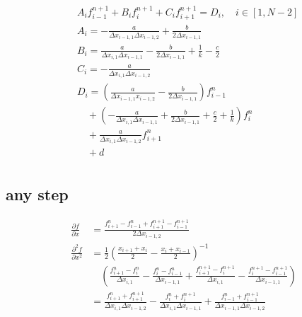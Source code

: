 \documentclass{article}
\begin{document}
    \begin{equation}
        \begin{split}
            &A_{i} f_{i-1}^{n+1} + B_{i} f_{i}^{n+1} + C_{i} f_{i+1}^{n+1} = D_{i}, \quad i \in [1, N-2]
            \\
            &A_{i} =
            -\frac{a}{\Delta x_{i-1,1}\Delta x_{i-1,2}} + \frac{b}{2\Delta x_{i-1,1}}
            \\
            &B_{i} =
            \frac{a}{\Delta x_{i,1} \Delta x_{i-1,1}} -\frac{b}{2 \Delta x_{i-1,1}} + \frac{1}{k} -\frac{c}{2}
            \\
            &C_{i} =
            -\frac{a}{\Delta x_{i,1} \Delta x_{i-1,2}}
            \\
            &D_{i} =
            \left(
            \frac{a}{\Delta x_{i-1,1} x_{i-1,2}} - \frac{b}{2 \Delta x_{i-1,1}}
            \right)
            f_{i-1}^n
            \\
            & \quad +
            \left(
            -\frac{a}{\Delta x_{i,1} \Delta x_{i-1,1}} + \frac{b}{2 \Delta x_{i-1,1}} + \frac{c}{2} + \frac{1}{k}
            \right)
            f_{i}^n
            \\
            &\quad +
            \frac{a}{\Delta x_{i,1} \Delta x_{i-1,2}}
            f_{i+1}^n
            \\
            &\quad + d \\
        \end{split}
    \end{equation}

\subsection{any step}

    \begin{equation}
        \begin{split}
            \frac{\partial f}{\partial x} &=
            \frac{f_{i+1}^n -f_{i-1}^n + f_{i+1}^{n+1} - f_{i-1}^{n+1}}
                {2 \Delta x_{i-1,2}} 
            \\
            \frac{\partial^2 f}{\partial x^2} &=
            \frac{1}{2}\left(\frac{x_{i+1}+x_i}{2} - \frac{x_i+x_{i-1}}{2}\right)^{-1}
            \\
            & \quad \left(
            \frac{f_{i+1}^n-f_{i}^n}{\Delta x_{i,1}}
            -\frac{f_{i}^n-f_{i-1}^n}{\Delta x_{i-1,1}}
            +\frac{f_{i+1}^{n+1}-f_{i}^{n+1}}{\Delta x_{i,1}}
            -\frac{f_{i}^{n+1}-f_{i-1}^{n+1}}{\Delta x_{i-1,1}}
            \right)
            \\
            &=\frac{f_{i+1}^n + f_{i+1}^{n+1}}
                {\Delta x_{i,1} \Delta x_{i-1,2}}
            - \frac{f_i^n + f_i^{n+1}}
                {\Delta x_{i,1} \Delta x_{i-1,1}}
            + \frac{f_{i-1}^n + f_{i-1}^{n+1}}
                {\Delta x_{i-1,1} \Delta x_{i-1,2}}
        \end{split}
    \end{equation}
\end{document}
